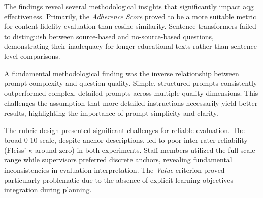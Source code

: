 
The findings reveal several methodological insights that significantly impact \ac{aqg} effectiveness. Primarily, the \textit{Adherence Score} proved to be a more suitable metric for content fidelity evaluation than cosine similarity. Sentence transformers failed to distinguish between source-based and no-source-based questions, demonstrating their inadequacy for longer educational texts rather than sentence-level comparisons.

A fundamental methodological finding was the inverse relationship between prompt complexity and question quality. Simple, structured prompts consistently outperformed complex, detailed prompts across multiple quality dimensions. This challenges the assumption that more detailed instructions necessarily yield better results, highlighting the importance of prompt simplicity and clarity.

The rubric design presented significant challenges for reliable evaluation. The broad 0-10 scale, despite anchor descriptions, led to poor inter-rater reliability (Fleiss' $\kappa$ around zero) in both experiments. Staff members utilized the full scale range while supervisors preferred discrete anchors, revealing fundamental inconsistencies in evaluation interpretation. The \textit{Value} criterion proved particularly problematic due to the absence of explicit learning objectives integration during planning.

